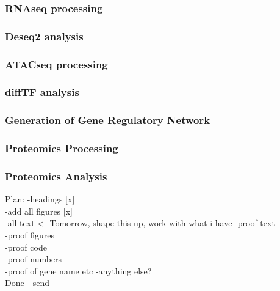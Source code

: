 \documentclass[11pt, a4paper, twosided]{book}
\begin{document}
\hypertarget{rnaseq-processing}{%
\subsubsection{RNAseq processing}\label{rnaseq-processing}}

\hypertarget{deseq2-analysis}{%
\subsubsection{Deseq2 analysis}\label{deseq2-analysis}}

\hypertarget{atacseq-processing-1}{%
\subsubsection{ATACseq processing}\label{atacseq-processing-1}}

\hypertarget{difftf-analysis}{%
\subsubsection{diffTF analysis}\label{difftf-analysis}}

\hypertarget{generation-of-gene-regulatory-network}{%
\subsubsection{Generation of Gene Regulatory Network}\label{generation-of-gene-regulatory-network}}

\hypertarget{proteomics-processing}{%
\subsubsection{Proteomics Processing}\label{proteomics-processing}}

\hypertarget{proteomics-analysis}{%
\subsubsection{Proteomics Analysis}\label{proteomics-analysis}}

Plan:
-headings {[}x{]}\\
-add all figures {[}x{]}\\
-all text \textless- Tomorrow, shape this up, work with what i have
-proof text\\
-proof figures\\
-proof code\\
-proof numbers\\
-proof of gene name etc
-anything else?\\
Done - send
\end{document}
